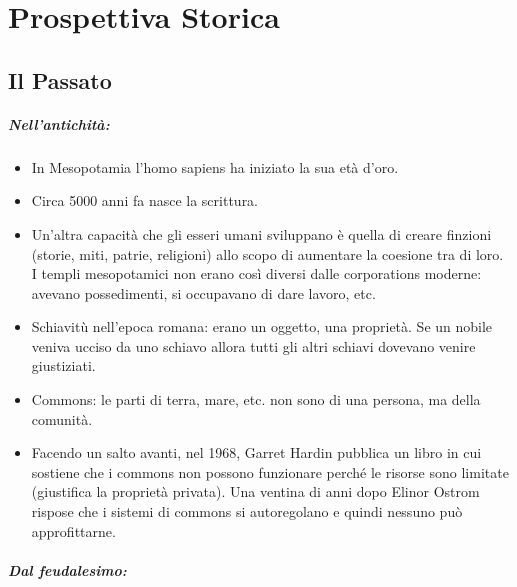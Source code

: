 \chapter{Prospettiva Storica}

\section{Il Passato}

\paragraph{Nell'antichità:}

\begin{itemize}
  \item In Mesopotamia l'homo sapiens ha iniziato la sua età d'oro. 
  \item Circa 5000 anni fa nasce la scrittura. 
  \item Un'altra capacità che gli esseri umani sviluppano è quella di creare finzioni (storie, miti, patrie, religioni) allo scopo di aumentare la coesione tra di loro. I templi mesopotamici non erano così diversi dalle corporations moderne: avevano possedimenti, si occupavano di dare lavoro, etc. 
  \item Schiavitù nell'epoca romana: erano un oggetto, una proprietà. Se un nobile veniva ucciso da uno schiavo allora tutti gli altri schiavi dovevano venire giustiziati. 
  \item Commons: le parti di terra, mare, etc. non sono di una persona, ma della comunità.
  \item Facendo un salto avanti, nel 1968, Garret Hardin pubblica un libro in cui sostiene che i commons non  possono funzionare perché le risorse sono limitate (giustifica la proprietà privata). Una ventina di anni dopo Elinor Ostrom rispose che i sistemi di commons si autoregolano e quindi nessuno può approfittarne.
\end{itemize}

\paragraph{Dal feudalesimo:}

